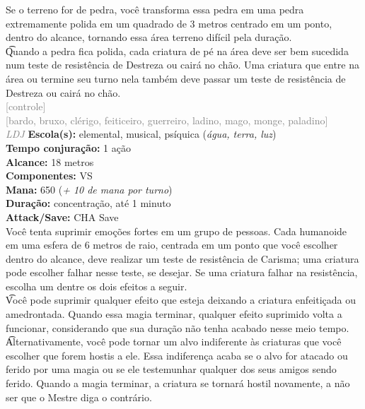 \documentclass{RPG_Adventure}[2021/10/20]
\begin{document}
{\normalsize Se o terreno for de pedra, você transforma essa pedra em uma pedra extremamente polida em um quadrado de 3 metros centrado em um ponto, dentro do alcance, tornando essa área terreno difícil pela duração.\\\t Quando a pedra fica polida, cada criatura de pé na área deve ser bem sucedida num teste de resistência de Destreza ou cairá no chão. Uma criatura que entre na área ou termine seu turno nela também deve passar um teste de resistência de Destreza ou cairá no chão.\\}
{\scriptsize \textcolor{gray}{[controle]\\}}
{\scriptsize \textcolor{gray}{[bardo, bruxo, clérigo, feiticeiro, guerreiro, ladino, mago, monge, paladino]\\}}
{\tiny \textcolor{gray}{\textit{LDJ}}}
{\small \t \textbf{Escola(s):} elemental, musical, psíquica (\textit{água, terra, luz})\\\t \textbf{Tempo conjuração:} 1 ação\\\t \textbf{Alcance:} 18 metros\\\t \textbf{Componentes:} VS\\\t \textbf{Mana:} 650 (\textit{+ 10 de mana por turno})\\\t \textbf{Duração:} concentração, até 1 minuto\\\t \textbf{Attack/Save:} CHA Save\\}
{\normalsize Você tenta suprimir emoções fortes em um grupo de pessoas. Cada humanoide em uma esfera de 6 metros de raio, centrada em um ponto que você escolher dentro do alcance, deve realizar um teste de resistência de Carisma; uma criatura pode escolher falhar nesse teste, se desejar.  Se uma criatura falhar na resistência, escolha um dentre os dois efeitos a seguir.\\\t Você pode suprimir qualquer efeito que esteja deixando a criatura enfeitiçada ou amedrontada. Quando essa magia terminar, qualquer efeito suprimido volta a funcionar, considerando que sua duração não tenha acabado nesse meio tempo.\\\t Alternativamente, você pode tornar um alvo indiferente às criaturas que você escolher que forem hostis a ele. Essa indiferença acaba se o alvo for atacado ou ferido por uma magia ou se ele testemunhar qualquer dos seus amigos sendo ferido. Quando a magia terminar, a criatura se tornará hostil novamente, a não ser que o Mestre diga o contrário.\\}
\end{document}
